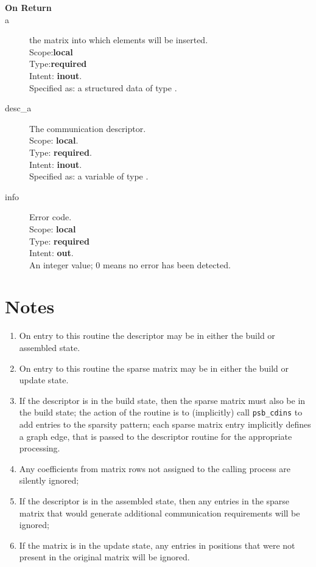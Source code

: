 \begin{description}
\item[\bf On Return]
\item[a] the matrix into which elements will be inserted.\\
Scope:{\bf local}\\
Type:{\bf required}\\
Intent: {\bf inout}.\\
Specified as: a structured data of type \spdata.
\item[desc\_a] The communication descriptor.\\
Scope: {\bf local}. \\
Type: {\bf required}.\\
Intent: {\bf inout}.\\
Specified as: a variable of type \descdata.\\
\item[info] Error code.\\
Scope: {\bf local} \\
Type: {\bf required} \\
Intent: {\bf out}.\\
An integer value; 0 means no error has been detected. 
\end{description}

\section*{Notes}
\begin{enumerate}
\item On entry to this routine the descriptor may be in either the
  build or assembled state.
\item On entry to this routine the sparse matrix may be in either the
  build or update state. 
\item If the descriptor is in the build state, then the sparse matrix
  must also be in the build state; the action of the routine is to
  (implicitly) call \verb|psb_cdins| to add entries to the sparsity
  pattern; each sparse matrix entry implicitly defines a graph edge,
  that is passed to the descriptor routine for the appropriate
  processing. 
\item Any coefficients from matrix rows not assigned to the calling
  process are silently ignored;
\item If the descriptor is in the assembled state, then any entries in
  the sparse matrix that would generate additional communication
  requirements will be ignored; 
\item If the matrix is in the update state, any entries in positions
  that were not present in the original matrix will be ignored. 
\end{enumerate}

